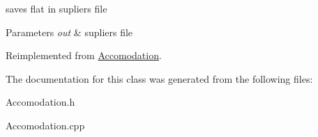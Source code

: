 saves flat in supliers file 


\begin{DoxyParams}{Parameters}
{\em out} & supliers file \\
\hline
\end{DoxyParams}


Reimplemented from \hyperlink{class_accomodation_a4394eb907b2d5a23faf73dd03c1dac4d}{Accomodation}.



The documentation for this class was generated from the following files\+:\begin{DoxyCompactItemize}
\item 
Accomodation.\+h\item 
Accomodation.\+cpp\end{DoxyCompactItemize}

